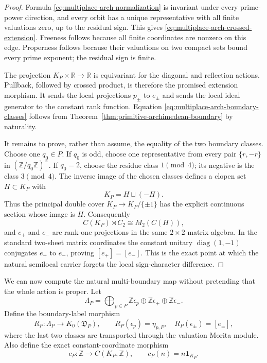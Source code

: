 \begin{proof}
Formula \eqref{eq:multiplace-arch-normalization} is invariant under every
prime-power direction, and every orbit has a unique representative with all
finite valuations zero, up to the residual sign.  This gives
\eqref{eq:multiplace-arch-crossed-extension}.  Freeness follows because all
finite coordinates are nonzero on this edge.  Properness follows because
their valuations on two compact sets bound every prime exponent; the residual
sign is finite.

The projection $K_P\times\mathbb R\to\mathbb R$ is equivariant for the
diagonal and reflection actions.  Pullback, followed by crossed product, is
therefore the promised extension morphism.  It sends the local projections
$p_\pm$ to $e_\pm$ and sends the local ideal generator to the constant rank
function.  Equation \eqref{eq:multiplace-arch-boundary-classes} follows from
Theorem~\ref{thm:primitive-archimedean-boundary} by naturality.

It remains to prove, rather than assume, the equality of the two boundary
classes.  Choose one $q_0\in P$.  If $q_0$ is odd, choose one representative
from every pair $\{r,-r\}$ in $(\mathbb Z/q_0\mathbb Z)^\times$.  If $q_0=2$,
choose the residue class $1\pmod 4$; its negative is the class
$3\pmod 4$.  The inverse image of the chosen classes defines a clopen set
$H\subset K_P$ with
\[
 K_P=H\sqcup(-H).
\]
Thus the principal double cover $K_P\to K_P/\{\pm1\}$ has the explicit
continuous section whose image is $H$.  Consequently
\[
 C(K_P)\rtimes C_2\cong M_2(C(H)),
\]
and $e_+$ and $e_-$ are rank-one projections in the same $2\times2$ matrix
algebra.  In the standard two-sheet matrix coordinates the constant unitary
$\operatorname{diag}(1,-1)$ conjugates $e_+$ to $e_-$, proving
$[e_+]=[e_-]$.  This is the exact point at which the natural semilocal carrier
forgets the local sign-character difference.
\end{proof}

We can now compute the natural multi-boundary map without pretending that the
whole action is proper.  Let
\[
 \Lambda_P=\bigoplus_{p\in P}\mathbb Z\epsilon_p
 \oplus\mathbb Z\epsilon_+\oplus\mathbb Z\epsilon_-.
\]
Define the boundary-label morphism
\begin{equation}
 R_P:\Lambda_P\longrightarrow K_0(\mathfrak D_P),\qquad
 R_P(\epsilon_p)=\eta_{p,P},\quad
 R_P(\epsilon_\pm)=[e_\pm],
 \label{eq:unstabilized-boundary-label-morphism}
\end{equation}
where the last two classes are transported through the valuation Morita
module.  Also define the exact constant-coordinate morphism
\[
 c_P:\mathbb Z\longrightarrow C(K_P,\mathbb Z),\qquad
 c_P(n)=n\mathbf1_{K_P}.
\]

